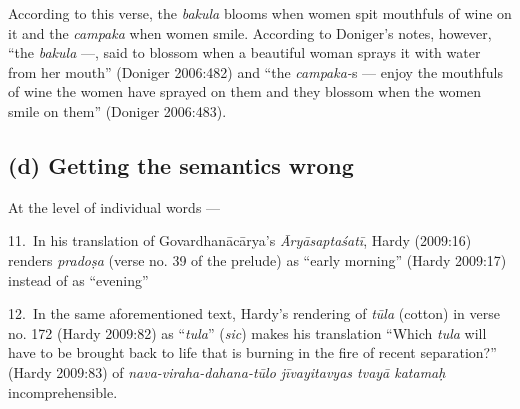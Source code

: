 According to this verse, the \textsl{bakula} blooms when women spit mouthfuls of wine on it and the \textsl{campaka} when women smile. According to Doniger’s notes, however, “the \textsl{bakula} ---, said to blossom when a beautiful woman sprays it with water from her mouth” (Doniger 2006:482) and “the \textsl{campaka-}s --- enjoy the mouthfuls of wine the women have sprayed on them and they blossom when the women smile on them” (Doniger 2006:483). 

\subsection*{(d) Getting the semantics wrong}

At the level of individual words --- 

11.~In his translation of Govardhanācārya’s \textsl{Āryāsaptaśatī}, Hardy (2009:16) renders \textsl{pradoṣa} (verse no. 39 of the prelude) as “early morning” (Hardy 2009:17) instead of as “evening”

12.~In the same aforementioned text, Hardy’s rendering of \textsl{tūla} (cotton) in verse no. 172 (Hardy 2009:82) as “\textsl{tula}” (\textsl{sic}) makes his translation “Which \textsl{tula} will have to be brought back to life that is burning in the fire of recent separation?” (Hardy 2009:83) of \textsl{nava-viraha-dahana-tūlo jīvayitavyas tvayā katamaḥ} incomprehensible. 

